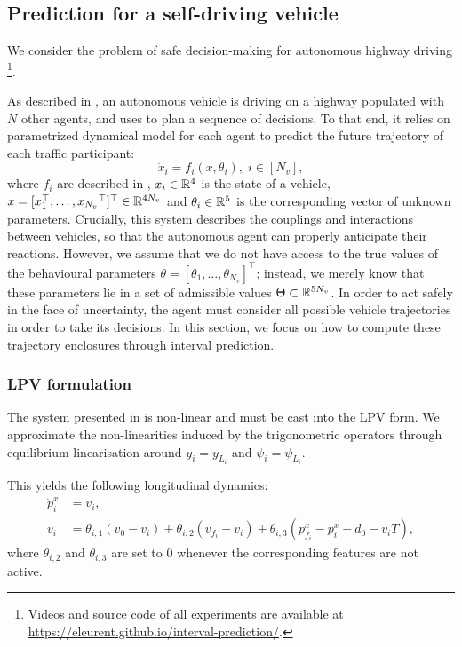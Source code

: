 \subsection{Prediction for a self-driving vehicle}
\label{sec:interval-prediction-experiments}
We consider the problem of safe decision-making for autonomous highway driving \citep{highway-env}\footnote{Videos and source code of all experiments are available at \href{https://eleurent.github.io/interval-prediction/}{https://eleurent.github.io/interval-prediction/}.}.

As described in , an autonomous vehicle is driving on a highway populated with $N$ other agents, and uses  to plan a sequence of decisions. To that end, it relies on parametrized dynamical model for each agent to predict the future trajectory of each traffic participant: $$\dot{x}_i=f_i(x,\theta_i),\;i\in[N_v],$$ where $f_i$ are described in , $x_i\in\mathbb{R}^4$ is the state of a vehicle, $x = [x_1^\top,\dots,{x_{N_v}}^\top]^\top\in\mathbb{R}^{4N_v}$ and $\theta_i\in\mathbb{R}^5$ is the corresponding vector of unknown parameters. Crucially, this system describes the couplings and interactions between vehicles, so that the autonomous agent can properly anticipate their reactions. 
However, we assume that we do not have access to the true values of the behavioural parameters $\theta=[\theta_1,\dots,\theta_{N_v}]^\top$; instead, we merely know that these parameters lie in a set of admissible values $\Theta\subset\mathbb{R}^{5N_v}$. In order to act safely in the face of uncertainty, the agent must consider all possible vehicle trajectories in order to take its decisions. In this section, we focus on how to compute these trajectory enclosures through interval prediction.

\subsubsection{\gls{LPV} formulation}

The system presented in  is non-linear and must be cast into the \gls{LPV} form. We approximate the non-linearities induced by the trigonometric operators through equilibrium linearisation around $y_i=y_{L_i}$ and $\psi_i=\psi_{L_i}$.

This yields the following longitudinal dynamics:
\begin{align*}
\dot{p}^x_i &= v_i,\\
\dot v_i &= \theta_{i,1} (v_0 - v_i) + \theta_{i,2} (v_{f_i} - v_i) + \theta_{i,3}(p^x_{f_i} - p^x_i - d_0 - v_i T),
\end{align*}
where $\theta_{i,2}$ and $\theta_{i,3}$ are set to $0$ whenever the corresponding features are not active.

